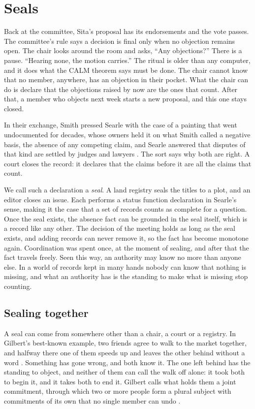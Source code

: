 \section{Seals}\label{sec:seals}

Back at the committee, Sita's proposal has its endorsements and the vote passes. The committee's
rule says a decision is final only when no objection remains open. The chair looks around the room
and asks, ``Any objections?'' There is a pause. ``Hearing none, the motion carries.'' The ritual is
older than any computer, and it does what the CALM theorem says must be done. The chair cannot know
that no member, anywhere, has an objection in their pocket. What the chair can do is declare that
the objections raised by now are the ones that count. After that, a member who objects next week
starts a new proposal, and this one stays closed.

In their exchange, Smith pressed Searle with the case of a painting that went undocumented for
decades, whose owners held it on what Smith called a negative basis, the absence of any competing
claim, and Searle answered that disputes of that kind are settled by judges and lawyers
\citep[pp.~289--290, 307]{smithsearle2003}. The sort says why both are right. A
court closes the record: it declares that the claims before it are all the claims that count.

We call such a declaration a \emph{seal}. A land registry seals the titles to a plot, and an editor
closes an issue. Each performs a status function declaration in Searle's sense, making it the case
that a set of records counts as complete for a question. Once the seal exists, the absence fact can
be grounded in the seal itself, which is a record like any other. The decision of the meeting holds
as long as the seal exists, and adding records can never remove it, so the fact has become monotone
again. Coordination was spent once, at the moment of sealing, and after that the fact travels freely.
Seen this way, an authority may know no more than anyone else. In a world of records kept in many
hands nobody can know that nothing is missing, and what an authority has is the standing to make
what is missing stop counting.

\subsection{Sealing together}\label{sec:joint}

A seal can come from somewhere other than a chair, a court or a registry. In Gilbert's best-known
example, two friends agree to walk to the market together, and halfway there one of them speeds up
and leaves the other behind without a word \citep{gilbert1990}. Something has gone wrong, and both
know it. The one left behind has the standing to object, and neither of them can call the walk off
alone: it took both to begin it, and it takes both to end it. Gilbert calls what holds them a joint
commitment, through which two or more people form a plural subject with commitments of its own that
no single member can undo \citep{gilbert2013}.

